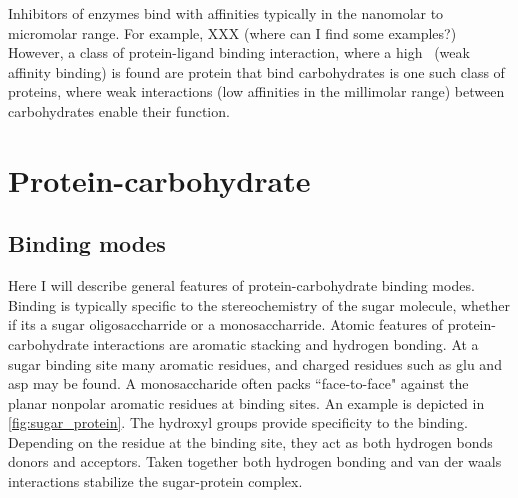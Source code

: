 
Inhibitors of enzymes bind with affinities typically in the nanomolar to micromolar range.  For example, XXX (where can I find some examples?) However, a class of protein-ligand binding interaction, where a high \KD\ (weak affinity binding) is found are protein that bind carbohydrates is one such class of proteins, where weak interactions (low affinities in the millimolar range) between carbohydrates enable their function.

\section{Protein-carbohydrate}

\subsection{Binding modes}
Here I will describe general features of protein-carbohydrate binding modes. Binding is typically specific to the stereochemistry of the sugar molecule, whether if its a sugar oligosaccharride or a monosaccharride. Atomic features of protein-carbohydrate interactions are aromatic stacking and hydrogen bonding.\cite{Vyas:1991p6498}  At a sugar binding site many aromatic residues, and charged residues such as glu and asp may be found. A monosaccharide often packs ``face-to-face" against the planar nonpolar aromatic residues at binding sites.  An example is depicted in \ref{fig:sugar_protein}.  The hydroxyl groups provide specificity to the binding.  Depending on the residue at the binding site, they act as both hydrogen bonds donors and acceptors. Taken together both hydrogen bonding and van der waals interactions stabilize the sugar-protein complex.

